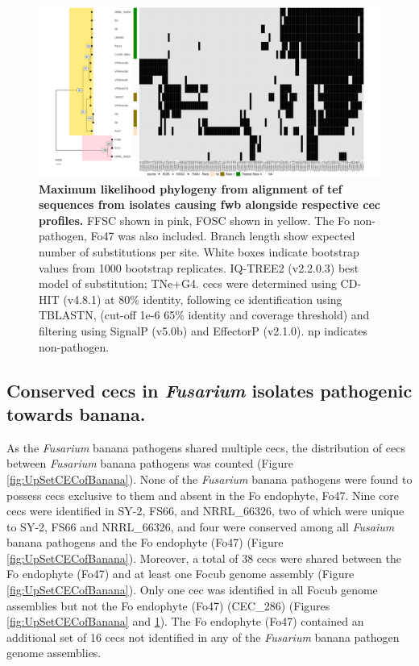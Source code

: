 \begin{figure}
    \centering
    \includegraphics[width=\textwidth]{Figures/HeatmapAndPhylo_BananaPathOnly.png}
    \captionsetup{width=24cm}
    \caption[Maximum likelihood phylogeny from alignment of \Acl{tef} sequences from isolates  causing \acl{fwb} alongside respective \acl{cec} profiles.]{\textbf{Maximum likelihood phylogeny from alignment of \Acf{tef} sequences from isolates causing \acl{fwb} alongside respective \acf{cec} profiles.} \ac{FFSC} shown in pink, \ac{FOSC} shown in yellow. The \ac{Fo} non-pathogen, Fo47 was also included. Branch length show expected number of substitutions per site. White boxes indicate bootstrap values from 1000 bootstrap replicates. IQ-TREE2 (v2.2.0.3) best model of substitution; TNe+G4. \Acp{cec} were determined using CD-HIT (v4.8.1) at 80\% identity, following \ac{ce} identification using TBLASTN, (cut-off 1e-6 65\% identity and coverage threshold) and filtering using SignalP (v5.0b) and EffectorP (v2.1.0). np indicates non-pathogen.}
    \label{fig:MaeiHeatmap-banana}
\end{figure}

\subsection{Conserved \aclp{cec} in \textit{Fusarium} isolates pathogenic towards banana.} 

As the \textit{Fusarium} banana pathogens shared multiple \acp{cec}, the distribution of \acp{cec} between \textit{Fusarium} banana pathogens was counted (Figure \ref{fig:UpSetCECofBanana}). None of the \textit{Fusarium} banana pathogens were found to possess \acp{cec} exclusive to them and absent in the \ac{Fo} endophyte, Fo47. Nine core \acp{cec} were identified in SY-2, FS66, and NRRL\_66326, two of which were unique to SY-2,  FS66 and NRRL\_66326, and four were conserved among all \textit{Fusaium} banana pathogens and the \ac{Fo} endophyte (Fo47) (Figure \ref{fig:UpSetCECofBanana}). Moreover, a total of 38 \acp{cec} were shared between the \ac{Fo} endophyte (Fo47) and at least one \ac{Focub} genome assembly (Figure \ref{fig:UpSetCECofBanana}). Only one \ac{cec} was identified in all \ac{Focub} genome assemblies but not the \ac{Fo} endophyte (Fo47) (CEC\_286) (Figures \ref{fig:UpSetCECofBanana} and \ref{fig:MaeiHeatmap-banana}). The \ac{Fo} endophyte (Fo47) contained an additional set of 16 \acp{cec} not identified in any of the \textit{Fusarium} banana pathogen genome assemblies.

